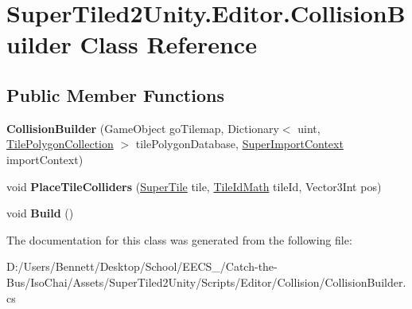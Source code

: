 \hypertarget{class_super_tiled2_unity_1_1_editor_1_1_collision_builder}{}\section{Super\+Tiled2\+Unity.\+Editor.\+Collision\+Builder Class Reference}
\label{class_super_tiled2_unity_1_1_editor_1_1_collision_builder}
\subsection*{Public Member Functions}
\begin{DoxyCompactItemize}
\item 
\mbox{\label{class_super_tiled2_unity_1_1_editor_1_1_collision_builder_a997292885fdc3d06aad9cfb39aec329a}} 
{\bfseries Collision\+Builder} (Game\+Object go\+Tilemap, Dictionary$<$ uint, \mbox{\hyperlink{class_super_tiled2_unity_1_1_editor_1_1_tile_polygon_collection}{Tile\+Polygon\+Collection}} $>$ tile\+Polygon\+Database, \mbox{\hyperlink{class_super_tiled2_unity_1_1_editor_1_1_super_import_context}{Super\+Import\+Context}} import\+Context)
\item 
\mbox{\label{class_super_tiled2_unity_1_1_editor_1_1_collision_builder_aa4ff7e6024fca30e2709058f16e8f6c1}} 
void {\bfseries Place\+Tile\+Colliders} (\mbox{\hyperlink{class_super_tiled2_unity_1_1_super_tile}{Super\+Tile}} tile, \mbox{\hyperlink{struct_super_tiled2_unity_1_1_editor_1_1_tile_id_math}{Tile\+Id\+Math}} tile\+Id, Vector3\+Int pos)
\item 
\mbox{\label{class_super_tiled2_unity_1_1_editor_1_1_collision_builder_ad571bff8d5d119759f72293082531261}} 
void {\bfseries Build} ()
\end{DoxyCompactItemize}


The documentation for this class was generated from the following file\+:\begin{DoxyCompactItemize}
\item 
D\+:/\+Users/\+Bennett/\+Desktop/\+School/\+E\+E\+C\+S\+\_/\+Catch-\/the-\/\+Bus/\+Iso\+Chai/\+Assets/\+Super\+Tiled2\+Unity/\+Scripts/\+Editor/\+Collision/Collision\+Builder.\+cs\end{DoxyCompactItemize}
